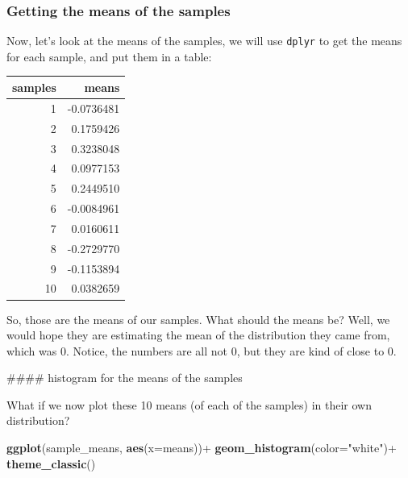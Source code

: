 \documentclass[]{book}
\newenvironment{Shaded}{\begin{snugshade}}{\end{snugshade}}
\newcommand{\KeywordTok}[1]{\textcolor[rgb]{0.13,0.29,0.53}{\textbf{{#1}}}}
\newcommand{\DataTypeTok}[1]{\textcolor[rgb]{0.13,0.29,0.53}{{#1}}}
\newcommand{\StringTok}[1]{\textcolor[rgb]{0.31,0.60,0.02}{{#1}}}
\newcommand{\NormalTok}[1]{{#1}}
\theoremstyle{definition}
\theoremstyle{definition}
\theoremstyle{definition}
\theoremstyle{remark}
\begin{document}
\subsubsection{Getting the means of the
samples}\label{getting-the-means-of-the-samples}

Now, let's look at the means of the samples, we will use \texttt{dplyr}
to get the means for each sample, and put them in a table:

\begin{Shaded}
\end{Shaded}

\begin{tabular}{r|r}
\hline
samples & means\\
\hline
1 & -0.0736481\\
\hline
2 & 0.1759426\\
\hline
3 & 0.3238048\\
\hline
4 & 0.0977153\\
\hline
5 & 0.2449510\\
\hline
6 & -0.0084961\\
\hline
7 & 0.0160611\\
\hline
8 & -0.2729770\\
\hline
9 & -0.1153894\\
\hline
10 & 0.0382659\\
\hline
\end{tabular}

So, those are the means of our samples. What should the means be? Well,
we would hope they are estimating the mean of the distribution they came
from, which was 0. Notice, the numbers are all not 0, but they are kind
of close to 0.

\#\#\#\# histogram for the means of the samples

What if we now plot these 10 means (of each of the samples) in their own
distribution?

\begin{Shaded}
\begin{Highlighting}[]
 \KeywordTok{ggplot}\NormalTok{(sample_means, }\KeywordTok{aes}\NormalTok{(}\DataTypeTok{x=}\NormalTok{means))+}
\StringTok{  }\KeywordTok{geom_histogram}\NormalTok{(}\DataTypeTok{color=}\StringTok{"white"}\NormalTok{)+}
\StringTok{  }\KeywordTok{theme_classic}\NormalTok{()}
\end{Highlighting}
\end{Shaded}
\end{document}
